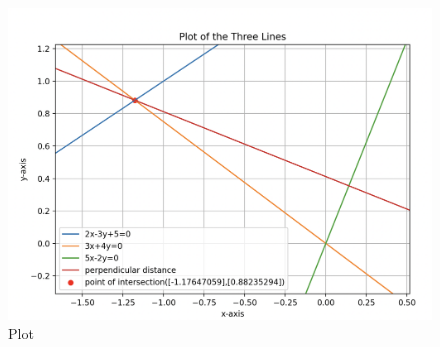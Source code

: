 \documentclass[12pt]{article}
\begin{document}
\begin{figure}[H]
    \centering
    \includegraphics[width=0.9\columnwidth]{Figs/Threelines.png}
    \caption{Plot}
    \label{fig:placeholder}
\end{figure}
\end{document}

